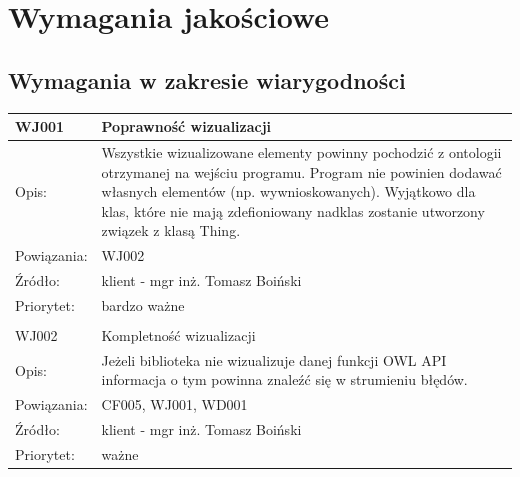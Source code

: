 \documentclass[a4paper,10pt]{article}
\begin{document}
\section{Wymagania jakościowe}


\subsection{Wymagania w zakresie wiarygodności}



\begin{center}

\begin{tabular}{|m{3cm}|m{9cm}|} \hline

WJ001 & Poprawność wizualizacji \\ \hline
Opis: & Wszystkie wizualizowane elementy powinny pochodzić z ontologii otrzymanej na wejściu programu. Program nie powinien dodawać własnych elementów (np. wywnioskowanych). Wyjątkowo dla klas, które nie mają zdefioniowany nadklas zostanie utworzony związek z klasą Thing. \\ \hline
Powiązania: & WJ002 \\ \hline
Źródło: &  klient - mgr inż. Tomasz Boiński \\ \hline
Priorytet: & bardzo ważne \\ \hline

\multicolumn{2}{c}{} \\
 \hline

WJ002 & Kompletność wizualizacji \\ \hline
Opis: & Jeżeli biblioteka nie wizualizuje danej funkcji OWL API informacja o tym powinna znaleźć się w strumieniu błędów. \\ \hline
Powiązania: & CF005, WJ001, WD001 \\ \hline
Źródło: & klient - mgr inż. Tomasz Boiński \\ \hline
Priorytet: & ważne \\ \hline

\end{tabular}

\end{center}
\end{document}
